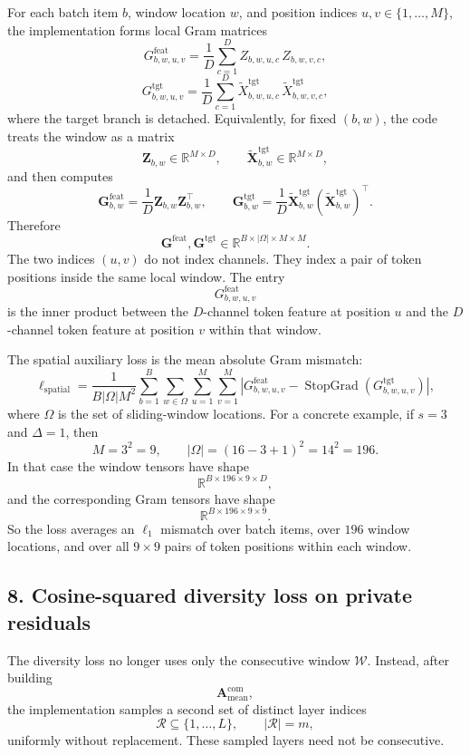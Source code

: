 \documentclass[11pt]{article}
\newcommand{\StopGrad}{\operatorname{StopGrad}}
\begin{document}
For each batch item $b$, window location $w$, and position indices $u,v\in\{1,\dots,M\}$, the implementation forms local Gram matrices
\[
  G^{\mathrm{feat}}_{b,w,u,v}
  =
  \frac{1}{D}\sum_{c=1}^{D}
  Z_{b,w,u,c}\, Z_{b,w,v,c},
\]
\[
  G^{\mathrm{tgt}}_{b,w,u,v}
  =
  \frac{1}{D}\sum_{c=1}^{D}
  \widetilde{X}^{\mathrm{tgt}}_{b,w,u,c}\, \widetilde{X}^{\mathrm{tgt}}_{b,w,v,c},
\]
where the target branch is detached.
Equivalently, for fixed $(b,w)$, the code treats the window as a matrix
\[
  \bm{Z}_{b,w} \in \mathbb{R}^{M\times D},
  \qquad
  \widetilde{\bm{X}}^{\mathrm{tgt}}_{b,w} \in \mathbb{R}^{M\times D},
\]
and then computes
\[
  \bm{G}^{\mathrm{feat}}_{b,w} = \frac{1}{D}\bm{Z}_{b,w}\bm{Z}_{b,w}^{\top},
  \qquad
  \bm{G}^{\mathrm{tgt}}_{b,w}
  =
  \frac{1}{D}\widetilde{\bm{X}}^{\mathrm{tgt}}_{b,w}
  \left(\widetilde{\bm{X}}^{\mathrm{tgt}}_{b,w}\right)^{\top}.
\]
Therefore
\[
  \bm{G}^{\mathrm{feat}},
  \bm{G}^{\mathrm{tgt}}
  \in
  \mathbb{R}^{B\times |\Omega|\times M\times M}.
\]
The two indices $(u,v)$ do not index channels. They index a pair of token positions inside the same local window. The entry
\[
  G^{\mathrm{feat}}_{b,w,u,v}
\]
is the inner product between the $D$-channel token feature at position $u$ and the $D$-channel token feature at position $v$ within that window.

The spatial auxiliary loss is the mean absolute Gram mismatch:
\[
  \ell_{\mathrm{spatial}}
  =
  \frac{1}{B |\Omega| M^2}
  \sum_{b=1}^{B}
  \sum_{w\in\Omega}
  \sum_{u=1}^{M}
  \sum_{v=1}^{M}
  \left|
    G^{\mathrm{feat}}_{b,w,u,v}
    -
    \StopGrad\!\left(G^{\mathrm{tgt}}_{b,w,u,v}\right)
  \right|,
\]
where $\Omega$ is the set of sliding-window locations.
For a concrete example, if $s=3$ and $\Delta=1$, then
\[
  M = 3^2 = 9,
  \qquad
  |\Omega| = (16-3+1)^2 = 14^2 = 196.
\]
In that case the window tensors have shape
\[
  \mathbb{R}^{B\times 196\times 9\times D},
\]
and the corresponding Gram tensors have shape
\[
  \mathbb{R}^{B\times 196\times 9\times 9}.
\]
So the loss averages an $\ell_1$ mismatch over batch items, over $196$ window locations, and over all $9\times 9$ pairs of token positions within each window.

\subsection*{8. Cosine-squared diversity loss on private residuals}
The diversity loss no longer uses only the consecutive window $\mathcal{W}$. Instead, after building
\[
  \bm{A}^{\mathrm{com}}_{\mathrm{mean}},
\]
the implementation samples a second set of distinct layer indices
\[
  \mathcal{R}\subseteq\{1,\dots,L\},
  \qquad
  |\mathcal{R}|=m,
\]
uniformly without replacement. These sampled layers need not be consecutive.
\end{document}
